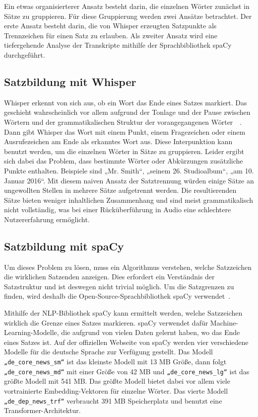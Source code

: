 Ein etwas organisierterer Ansatz besteht darin, die einzelnen Wörter zunächst in Sätze zu gruppieren.
Für diese Gruppierung werden zwei Ansätze betrachtet.
Der erste Ansatz besteht darin, die von Whisper erzeugten Satzpunkte als Trennzeichen für einen Satz zu erlauben.
Als zweiter Ansatz wird eine tiefergehende Analyse der Transkripte mithilfe der Sprachbibliothek spaCy durchgeführt.

\subsection{Satzbildung mit Whisper}

Whisper erkennt von sich aus, ob ein Wort das Ende eines Satzes markiert.
Das geschieht wahrscheinlich vor allem aufgrund der Tonlage und der Pause zwischen Wörtern und der grammatikalischen Struktur der vorangegangenen Wörter~\cite{biron2021}~\cite{radford}.
Dann gibt Whisper das Wort mit einem Punkt, einem Fragezeichen oder einem Ausrufezeichen am Ende als erkanntes Wort aus.
Diese Interpunktion kann benutzt werden, um die einzelnen Wörter in Sätze zu gruppieren.
Leider ergibt sich dabei das Problem, dass bestimmte Wörter oder Abkürzungen zusätzliche Punkte enthalten.
Beispiele sind „Mr. Smith“, „seinem 26. Studioalbum“, „am 10. Januar 2016“.
Mit diesem naiven Ansatz der Satztrennung würden einige Sätze an ungewollten Stellen in mehrere Sätze aufgetrennt werden.
Die resultierenden Sätze bieten weniger inhaltlichen Zusammenhang und sind meist grammatikalisch nicht vollständig, was bei einer Rücküberführung in Audio eine schlechtere Nutzererfahrung ermöglicht.

\subsection{Satzbildung mit spaCy}

Um dieses Problem zu lösen, muss ein Algorithmus verstehen, welche Satzzeichen die wirklichen Satzenden anzeigen.
Dies erfordert ein Verständnis der Satzstruktur und ist deswegen nicht trivial möglich.
Um die Satzgrenzen zu finden, wird deshalb die Open-Source-Sprachbibliothek spaCy verwendet~\cite{honnibal2017}.

Mithilfe der NLP-Bibliothek spaCy kann ermittelt werden, welche Satzzeichen wirklich die Grenze eines Satzes markieren.
spaCy verwendet dafür Machine-Learning-Modelle, die aufgrund von vielen Daten gelernt haben, wo das Ende eines Satzes ist.
Auf der offiziellen Webseite von spaCy werden vier verschiedene Modelle für die deutsche Sprache zur Verfügung gestellt.
Das Modell \verb|„de_core_news_sm“| ist das kleinste Modell mit 13 MB Größe, dann folgt \verb|„de_core_news_md“| mit einer Größe von 42 MB und \verb|„de_core_news_lg“| ist das größte Modell mit 541 MB.
Das größte Modell bietet dabei vor allem viele vortrainierte Embedding-Vektoren für einzelne Wörter.
Das vierte Modell \verb|„de_dep_news_trf“| verbraucht 391 MB Speicherplatz und benutzt eine Transformer-Architektur.~\cite{spacy2024}

